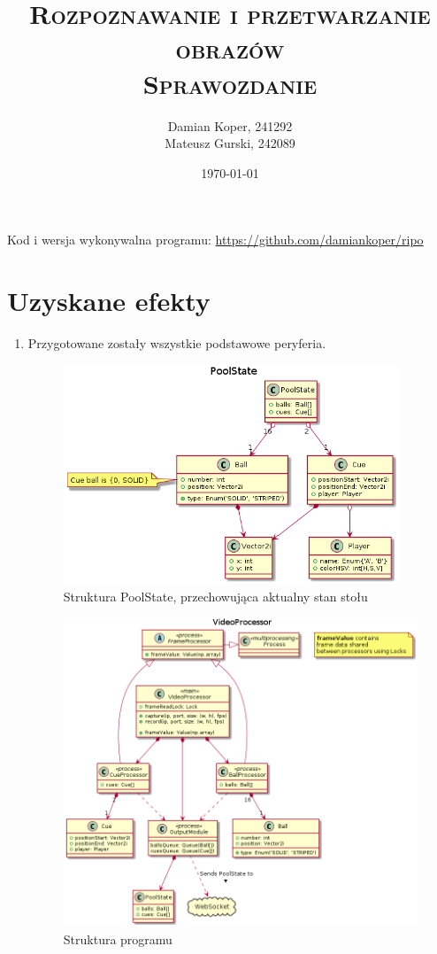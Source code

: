 \documentclass[12pt]{article}
\title{ 
    \vspace*{50mm}
    \textsc{
        \textbf{Rozpoznawanie i przetwarzanie obrazów}\\
        \large Sprawozdanie 
    }
}
\author{
Damian Koper,  241292\\
Mateusz Gurski, 242089
}
\date{\today}
\begin{document}
\maketitle

\newpage
\setcounter{tocdepth}{2}
\localtableofcontents
\listoffigures 
\lstlistoflistings
\vfill
Kod i wersja wykonywalna programu: \url{https://github.com/damiankoper/ripo}
\newpage

\section{Uzyskane efekty}


\begin{enumerate}
    
\item Przygotowane zostały wszystkie podstawowe peryferia. 

\begin{figure}[H]
    \centering
    \includegraphics[width=10cm]{./diagrams/out/pull_state_cd.png}
    \caption{Struktura PoolState, przechowująca aktualny stan stołu}
    \label{}
\end{figure}

\begin{figure}[H]
    \centering
    \includegraphics[width=14cm]{./diagrams/out/video_processor_cd.png}
    \caption{Struktura programu}
    \label{}
\end{figure}


\end{enumerate}
\end{document}
